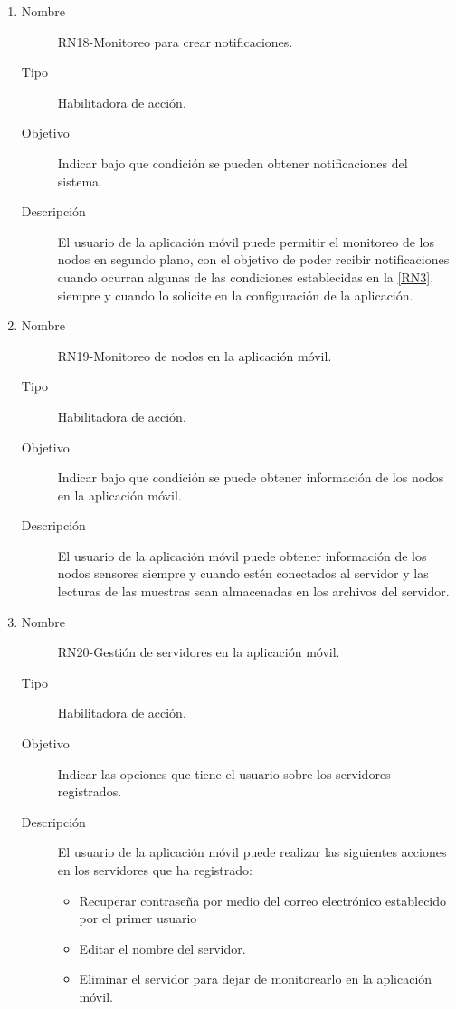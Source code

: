\begin{enumerate}[label=RN\arabic*.]
\item \label{RN18}
		\begin{description}
			\item[Nombre] RN18-Monitoreo para crear notificaciones.
			\item[Tipo] Habilitadora de acción.
			\item[Objetivo] Indicar bajo que condición se pueden obtener notificaciones del sistema.
			\item[Descripción] El usuario de la aplicación móvil puede permitir el monitoreo de los nodos en segundo plano, con el objetivo de poder recibir notificaciones cuando ocurran algunas de las condiciones establecidas en la \ref{RN3}, siempre y cuando lo solicite en la configuración de la aplicación.
		\end{description}
\item \label{RN19}
		\begin{description}
			\item[Nombre] RN19-Monitoreo de nodos en la aplicación móvil.
			\item[Tipo] Habilitadora de acción.
			\item[Objetivo] Indicar bajo que condición se puede obtener información de los nodos en la aplicación móvil.
			\item[Descripción] El usuario de la aplicación móvil puede obtener información de los nodos sensores siempre y cuando estén conectados al servidor y las lecturas de las muestras sean almacenadas en los archivos del servidor.
		\end{description}
		
\item \label{RN20}
		\begin{description}
			\item[Nombre] RN20-Gestión de servidores en la aplicación móvil.
			\item[Tipo] Habilitadora de acción.
			\item[Objetivo] Indicar las opciones que tiene el usuario sobre los servidores registrados.
			\item[Descripción] El usuario de la aplicación móvil puede realizar las siguientes acciones en los servidores que ha registrado:
			\begin{itemize}
		 		\item Recuperar contraseña por medio del correo electrónico establecido por el primer usuario
		 		\item Editar el nombre del servidor.
		 		\item Eliminar el servidor para dejar de monitorearlo en la aplicación móvil.
		    \end{itemize}
		\end{description}


\end{enumerate}
